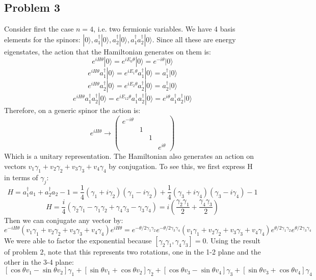 \documentclass[12 pt]{article}
\begin{document}
\subsection*{Problem 3}
Consider first the case $n=4$, i.e. two fermionic variables. We have 4 basis elements for the spinors: $|0\rangle , a_1^{\dagger}|0\rangle, a_2^{\dagger}|0\rangle, a_1^{\dagger}a_2^{\dagger}|0\rangle$. Since all these are energy eigenstates, the action that the Hamiltonian generates on them is:
\[   e^{iH\theta} |0\rangle = e^{iE_0 \theta} |0\rangle = e^{-i\theta} |0 \rangle    \]
\[   e^{iH\theta} a_1^{\dagger}|0\rangle = e^{iE_1 \theta} a_1^{\dagger}|0\rangle =  a_1^{\dagger}|0 \rangle    \]
\[   e^{iH\theta} a_2^{\dagger}|0\rangle = e^{iE_2 \theta} a_2^{\dagger}|0\rangle =  a_2^{\dagger}|0 \rangle    \]
\[   e^{iH\theta} a_1^{\dagger}a_2^{\dagger}|0\rangle = e^{iE_{12} \theta} a_1^{\dagger}a_2^{\dagger}|0\rangle = e^{i\theta} a_1^{\dagger}a_2^{\dagger}|0 \rangle    \]
Therefore, on a generic spinor the action is:
\[   e^{iH\theta} \to \left( \begin{array} {cccc}     e^{-i\theta} & & & \\ & 1 & & \\ & & 1 & \\ & & & e^{i\theta}      \end{array} \right)  \]
Which is a unitary representation. The Hamiltonian also generates an action on vectors $v_1 \gamma_1 + v_2 \gamma_2 + v_3 \gamma_3 + v_4 \gamma_4$ by conjugation. To see this, we first express H in terms of $\gamma_j$:
\[   H = a_1^{\dagger}a_1 + a_2^{\dagger}a_2 - 1 = \frac{1}{4}(\gamma_1+ i \gamma_2)(\gamma_1 - i\gamma_2) + \frac{1}{4}(\gamma_3 + i\gamma_4)(\gamma_3 - i\gamma_4) -1  \]
\[   H = \frac{i}{4}(\gamma_2\gamma_1 - \gamma_1\gamma_2 + \gamma_4\gamma_3 - \gamma_3\gamma_4) = i \left(  \frac{\gamma_2\gamma_1}{2} + \frac{\gamma_4\gamma_3}{2}  \right) \]
Then we can conjugate any vector by:
\[   e^{-iH\theta} (v_1 \gamma_1 + v_2 \gamma_2 + v_3 \gamma_3 + v_4 \gamma_4) e^{iH\theta} = e^{-\theta/2 \gamma_1\gamma_2} e^{-\theta/2\gamma_3\gamma_4} (v_1 \gamma_1 + v_2 \gamma_2 + v_3 \gamma_3 + v_4 \gamma_4) e^{\theta/2 \gamma_1\gamma_2} e^{\theta/2\gamma_3\gamma_4}    \]
We were able to factor the exponential because $[\gamma_2\gamma_1 , \gamma_4\gamma_3] = 0$. Using the result of problem 2, note that this represents two rotations, one in the 1-2 plane and the other in the 3-4 plane:
\[   [\cos \theta v_1 - \sin\theta v_2 ]\gamma_1 + [\sin\theta v_1 + \cos\theta v_2] \gamma_2  +  [\cos \theta v_3 - \sin\theta v_4 ]\gamma_3 + [\sin\theta v_3 + \cos\theta v_4] \gamma_4  \]
\end{document}
